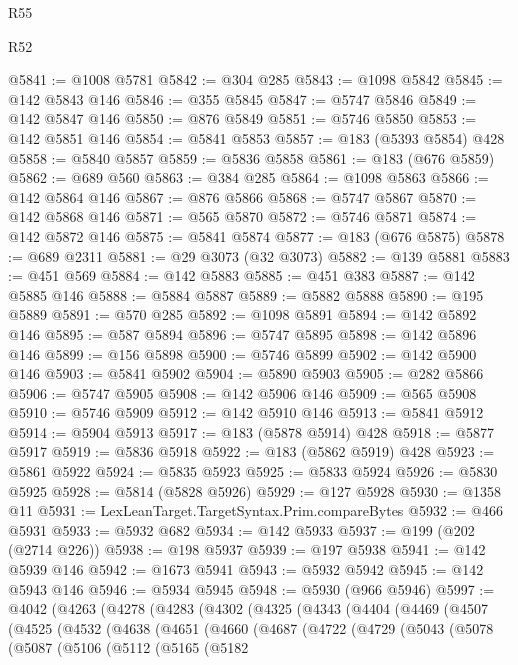 \begin{lexlean}{R55}
\begin{lexlean}{R52}
\begin{coremodule}
{{{{{{{{{{{{{{{{{{{{{{{{{{{{{{{{{{{{{{{{{{{{{{{{{{{{{{{{{{{{{{{{{{{{{{{{{{{{{{{{{{{{{{{{{{{{{{{{{{{{{{{{{{{{{{{{{{{{{{{{{{{{{{{{{{{{{{{{{{{{{{{{{{{{{{{{{{{{{{{{{{{{{{{{{{{{{{{{{{{{{{{{{{{{{{{{{{{{{{@5841 := @1008 @5781
@5842 := @304 @285
@5843 := @1098 @5842
@5845 := @142 @5843 @146
@5846 := @355 @5845
@5847 := @5747 @5846
@5849 := @142 @5847 @146
@5850 := @876 @5849
@5851 := @5746 @5850
@5853 := @142 @5851 @146
@5854 := @5841 @5853
@5857 := @183 (@5393 @5854) @428
@5858 := @5840 @5857
@5859 := @5836 @5858
@5861 := @183 (@676 @5859)
@5862 := @689 @560
@5863 := @384 @285
@5864 := @1098 @5863
@5866 := @142 @5864 @146
@5867 := @876 @5866
@5868 := @5747 @5867
@5870 := @142 @5868 @146
@5871 := @565 @5870
@5872 := @5746 @5871
@5874 := @142 @5872 @146
@5875 := @5841 @5874
@5877 := @183 (@676 @5875)
@5878 := @689 @2311
@5881 := @29 @3073 (@32 @3073)
@5882 := @139 @5881
@5883 := @451 @569
@5884 := @142 @5883
@5885 := @451 @383
@5887 := @142 @5885 @146
@5888 := @5884 @5887
@5889 := @5882 @5888
@5890 := @195 @5889
@5891 := @570 @285
@5892 := @1098 @5891
@5894 := @142 @5892 @146
@5895 := @587 @5894
@5896 := @5747 @5895
@5898 := @142 @5896 @146
@5899 := @156 @5898
@5900 := @5746 @5899
@5902 := @142 @5900 @146
@5903 := @5841 @5902
@5904 := @5890 @5903
@5905 := @282 @5866
@5906 := @5747 @5905
@5908 := @142 @5906 @146
@5909 := @565 @5908
@5910 := @5746 @5909
@5912 := @142 @5910 @146
@5913 := @5841 @5912
@5914 := @5904 @5913
@5917 := @183 (@5878 @5914) @428
@5918 := @5877 @5917
@5919 := @5836 @5918
@5922 := @183 (@5862 @5919) @428
@5923 := @5861 @5922
@5924 := @5835 @5923
@5925 := @5833 @5924
@5926 := @5830 @5925
@5928 := @5814 (@5828 @5926)
@5929 := @127 @5928
@5930 := @1358 @11
@5931 := LexLeanTarget.TargetSyntax.Prim.compareBytes
@5932 := @466 @5931
@5933 := @5932 @682
@5934 := @142 @5933
@5937 := @199 (@202 (@2714 @226))
@5938 := @198 @5937
@5939 := @197 @5938
@5941 := @142 @5939 @146
@5942 := @1673 @5941
@5943 := @5932 @5942
@5945 := @142 @5943 @146
@5946 := @5934 @5945
@5948 := @5930 (@966 @5946)
@5997 := @4042
    (@4263
      (@4278
        (@4283
          (@4302
            (@4325
              (@4343
                (@4404
                  (@4469
                    (@4507
                      (@4525
                        (@4532
                          (@4638
                            (@4651
                              (@4660
                                (@4687
                                  (@4722
                                    (@4729
                                      (@5043
                                        (@5078
                                          (@5087
                                            (@5106
                                              (@5112
                                                (@5165
                                                  (@5182
}}}}}}}}}}}}}}}}}}}}}}}}}}}}}}}}}}}}}}}}}}}}}}}}}}}}}}}}}}}}}}}}}}}}}}}}}}}}}}}}}}}}}}}}}}}}}}}}}}}}}}}}}}}}}}}}}}}}}}}}}}}}}}}}}}}}}}}}}}}}}}}}}}}}}}}}}}}}}}}}}}}}}}}}}}}}}}}}}}}}}}}}}}}}}}}}}}}}}}
\end{coremodule}
\end{lexlean}
\end{lexlean}
